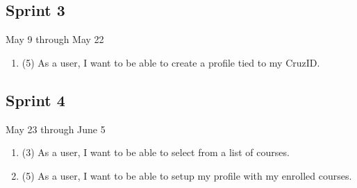 \documentclass[10pt]{article}
\begin{document}
    \subsection{Sprint 3}
    May 9 through May 22
    \begin{enumerate}
        \item (5) As a user, I want to be able to create a profile tied to my CruzID.
    \end{enumerate}

    \subsection{Sprint 4}
    May 23 through June 5
    \begin{enumerate}
        \item (3) As a user, I want to be able to select from a list of courses.
        \item (5) As a user, I want to be able to setup my profile with my enrolled courses.
    \end{enumerate}
\end{document}
